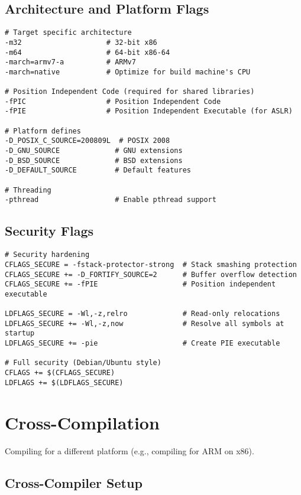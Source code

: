 \subsection{Architecture and Platform Flags}

\begin{lstlisting}
# Target specific architecture
-m32                    # 32-bit x86
-m64                    # 64-bit x86-64
-march=armv7-a          # ARMv7
-march=native           # Optimize for build machine's CPU

# Position Independent Code (required for shared libraries)
-fPIC                   # Position Independent Code
-fPIE                   # Position Independent Executable (for ASLR)

# Platform defines
-D_POSIX_C_SOURCE=200809L  # POSIX 2008
-D_GNU_SOURCE             # GNU extensions
-D_BSD_SOURCE             # BSD extensions
-D_DEFAULT_SOURCE         # Default features

# Threading
-pthread                  # Enable pthread support
\end{lstlisting}

\subsection{Security Flags}

\begin{lstlisting}
# Security hardening
CFLAGS_SECURE = -fstack-protector-strong  # Stack smashing protection
CFLAGS_SECURE += -D_FORTIFY_SOURCE=2      # Buffer overflow detection
CFLAGS_SECURE += -fPIE                    # Position independent executable

LDFLAGS_SECURE = -Wl,-z,relro             # Read-only relocations
LDFLAGS_SECURE += -Wl,-z,now              # Resolve all symbols at startup
LDFLAGS_SECURE += -pie                    # Create PIE executable

# Full security (Debian/Ubuntu style)
CFLAGS += $(CFLAGS_SECURE)
LDFLAGS += $(LDFLAGS_SECURE)
\end{lstlisting}

\section{Cross-Compilation}

Compiling for a different platform (e.g., compiling for ARM on x86).

\subsection{Cross-Compiler Setup}

